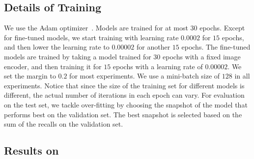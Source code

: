 \subsection{Details of Training}
\label{sec:train_detail}
We use the Adam optimizer~\cite{kingma2014adam}.  Models are trained 
for at most $30$ epochs.  Except for fine-tuned models,  we start 
training with learning rate $0.0002$ for $15$ epochs, and then lower the 
learning rate to $0.00002$ for another $15$ epochs.  The fine-tuned models are 
trained by taking a model trained for $30$ epochs with a fixed image 
encoder, and then training it for $15$ epochs with a learning rate of $0.00002$.  
We set the margin to $0.2$ for most experiments.  We use a mini-batch 
size of $128$ in all  experiments.  Notice that since the size of the 
training set for different models is different, the actual number of 
iterations in each epoch can vary. For evaluation on the test set, 
we tackle over-fitting by choosing the snapshot of the model that 
performs best on the validation set.  The best snapshot is selected based 
on the sum of the recalls on the validation set.





\subsection{Results on \coco{}}

